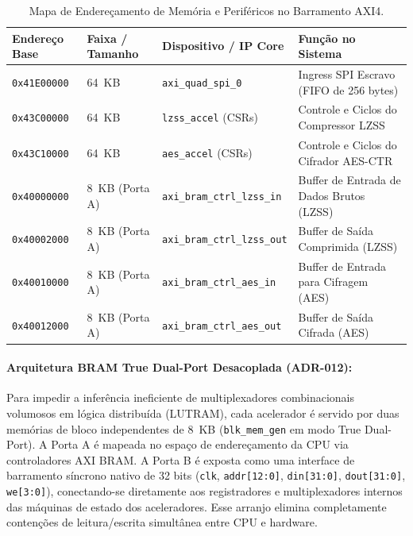\documentclass[11pt,a4paper]{article}
\begin{document}
\begin{table}[htbp]
  \centering
  \small
  \caption{Mapa de Endereçamento de Memória e Periféricos no Barramento AXI4.}
  \label{tab:address_map}
  \begin{tabular}{@{}llll@{}}
    \toprule
    \textbf{Endereço Base} & \textbf{Faixa / Tamanho} & \textbf{Dispositivo / IP Core} & \textbf{Função no Sistema} \\
    \midrule
    \texttt{0x41E00000} & 64~KB & \texttt{axi\_quad\_spi\_0} & Ingress SPI Escravo (FIFO de 256 bytes) \\
    \texttt{0x43C00000} & 64~KB & \texttt{lzss\_accel} (CSRs) & Controle e Ciclos do Compressor LZSS \\
    \texttt{0x43C10000} & 64~KB & \texttt{aes\_accel} (CSRs) & Controle e Ciclos do Cifrador AES-CTR \\
    \texttt{0x40000000} & 8~KB (Porta A) & \texttt{axi\_bram\_ctrl\_lzss\_in} & Buffer de Entrada de Dados Brutos (LZSS) \\
    \texttt{0x40002000} & 8~KB (Porta A) & \texttt{axi\_bram\_ctrl\_lzss\_out} & Buffer de Saída Comprimida (LZSS) \\
    \texttt{0x40010000} & 8~KB (Porta A) & \texttt{axi\_bram\_ctrl\_aes\_in} & Buffer de Entrada para Cifragem (AES) \\
    \texttt{0x40012000} & 8~KB (Porta A) & \texttt{axi\_bram\_ctrl\_aes\_out} & Buffer de Saída Cifrada (AES) \\
    \bottomrule
  \end{tabular}
\end{table}

\paragraph{Arquitetura BRAM True Dual-Port Desacoplada (ADR-012):}
Para impedir a inferência ineficiente de multiplexadores combinacionais volumosos em lógica distribuída (LUTRAM), cada acelerador é servido por duas memórias de bloco independentes de 8~KB (\texttt{blk\_mem\_gen} em modo True Dual-Port). A Porta A é mapeada no espaço de endereçamento da CPU via controladores AXI BRAM. A Porta B é exposta como uma interface de barramento síncrono nativo de 32 bits (\texttt{clk}, \texttt{addr[12:0]}, \texttt{din[31:0]}, \texttt{dout[31:0]}, \texttt{we[3:0]}), conectando-se diretamente aos registradores e multiplexadores internos das máquinas de estado dos aceleradores. Esse arranjo elimina completamente contenções de leitura/escrita simultânea entre CPU e hardware.
\end{document}
